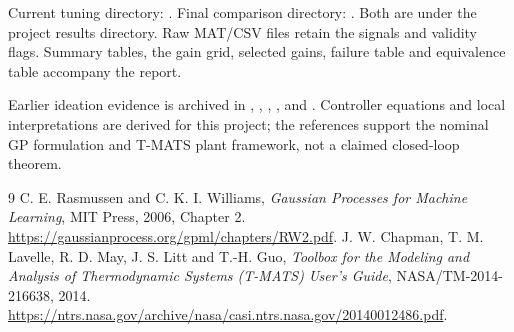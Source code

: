 \documentclass[11pt,a4paper]{article}
\begin{document}
Current tuning directory: . Final comparison directory: . Both are under the project results directory. Raw MAT/CSV files retain the signals and validity flags. Summary tables, the gain grid, selected gains, failure table and equivalence table accompany the report.

Earlier ideation evidence is archived in , , , , and . Controller equations and local interpretations are derived for this project; the references support the nominal GP formulation and T-MATS plant framework, not a claimed closed-loop theorem.
\begin{thebibliography}{9}
 C. E. Rasmussen and C. K. I. Williams, \emph{Gaussian Processes for Machine Learning}, MIT Press, 2006, Chapter 2. \url{https://gaussianprocess.org/gpml/chapters/RW2.pdf}.
 J. W. Chapman, T. M. Lavelle, R. D. May, J. S. Litt and T.-H. Guo, \emph{Toolbox for the Modeling and Analysis of Thermodynamic Systems (T-MATS) User's Guide}, NASA/TM-2014-216638, 2014. \url{https://ntrs.nasa.gov/archive/nasa/casi.ntrs.nasa.gov/20140012486.pdf}.
\end{thebibliography}
\end{document}
